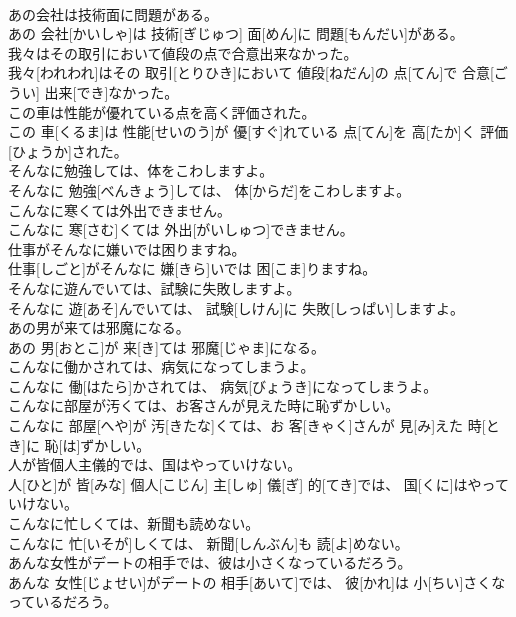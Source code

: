 \documentclass[8pt]{extreport}
\begin{document}
\begin{CJK}{UTF8}{min}
\\	あの会社は技術面に問題がある。	
\\	あの 会社[かいしゃ]は 技術[ぎじゅつ] 面[めん]に 問題[もんだい]がある。
\\	我々はその取引において値段の点で合意出来なかった。	
\\	我々[われわれ]はその 取引[とりひき]において 値段[ねだん]の 点[てん]で 合意[ごうい] 出来[でき]なかった。
\\	この車は性能が優れている点を高く評価された。	
\\	この 車[くるま]は 性能[せいのう]が 優[すぐ]れている 点[てん]を 高[たか]く 評価[ひょうか]された。
\\	そんなに勉強しては、体をこわしますよ。	
\\	そんなに 勉強[べんきょう]しては、 体[からだ]をこわしますよ。
\\	こんなに寒くては外出できません。	
\\	こんなに 寒[さむ]くては 外出[がいしゅつ]できません。
\\	仕事がそんなに嫌いでは困りますね。	
\\	仕事[しごと]がそんなに 嫌[きら]いでは 困[こま]りますね。
\\	そんなに遊んでいては、試験に失敗しますよ。	
\\	そんなに 遊[あそ]んでいては、 試験[しけん]に 失敗[しっぱい]しますよ。
\\	あの男が来ては邪魔になる。	
\\	あの 男[おとこ]が 来[き]ては 邪魔[じゃま]になる。
\\	こんなに働かされては、病気になってしまうよ。	
\\	こんなに 働[はたら]かされては、 病気[びょうき]になってしまうよ。
\\	こんなに部屋が汚くては、お客さんが見えた時に恥ずかしい。	
\\	こんなに 部屋[へや]が 汚[きたな]くては、お 客[きゃく]さんが 見[み]えた 時[とき]に 恥[は]ずかしい。
\\	人が皆個人主儀的では、国はやっていけない。	
\\	人[ひと]が 皆[みな] 個人[こじん] 主[しゅ] 儀[ぎ] 的[てき]では、 国[くに]はやっていけない。
\\	こんなに忙しくては、新聞も読めない。	
\\	こんなに 忙[いそが]しくては、 新聞[しんぶん]も 読[よ]めない。
\\	あんな女性がデートの相手では、彼は小さくなっているだろう。	
\\	あんな 女性[じょせい]がデートの 相手[あいて]では、 彼[かれ]は 小[ちい]さくなっているだろう。

\end{CJK}
\end{document}
